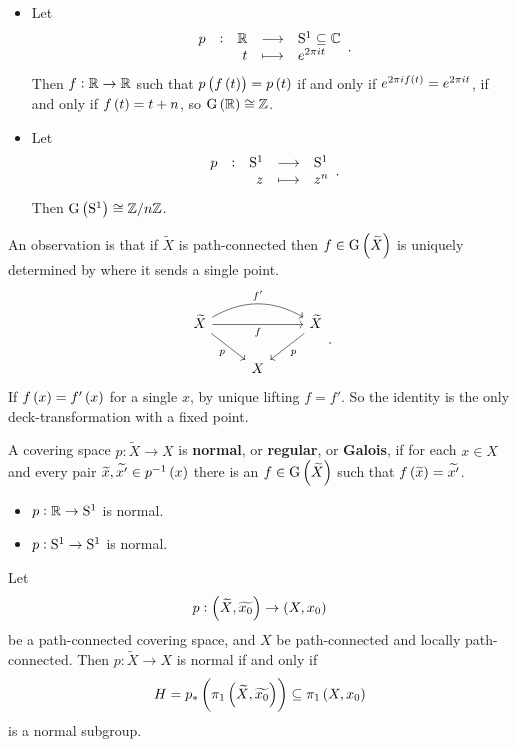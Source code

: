 \begin{example*}
\hfill
\begin{itemize}
\item Let
$$ \function[p]{\RR}{\S^1 \subseteq \CC}{t}{e^{2\pi i t}}. $$
Then $ f : \RR \to \RR $ such that $ p\br{f\br{t}} = p\br{t} $ if and only if $ e^{2\pi if\br{t}} = e^{2\pi it} $, if and only if $ f\br{t} = t + n $, so $ \G\br{\RR} \cong \ZZ $.
\item Let
$$ \function[p]{\S^1}{\S^1}{z}{z^n}. $$
Then $ \G\br{\S^1} \cong \ZZ / n\ZZ $.
\end{itemize}
\end{example*}

An observation is that if $ \widetilde{X} $ is path-connected then $ f \in \G\br{\widetilde{X}} $ is uniquely determined by where it sends a single point.
$$
\begin{tikzcd}
\widetilde{X} \arrow{rr}[swap]{f} \arrow[bend left=30]{rr}{f'} \arrow{dr}[swap]{p} & & \widetilde{X} \arrow{dl}{p} \\
& X &
\end{tikzcd}.
$$
If $ f\br{x} = f'\br{x} $ for a single $ x $, by unique lifting $ f = f' $. So the identity is the only deck-transformation with a fixed point.

\pagebreak

\begin{definition*}
A covering space $ p : \widetilde{X} \to X $ is \textbf{normal}, or \textbf{regular}, or \textbf{Galois}, if for each $ x \in X $ and every pair $ \widetilde{x}, \widetilde{x'} \in p^{-1}\br{x} $ there is an $ f \in \G\br{\widetilde{X}} $ such that $ f\br{\widetilde{x}} = \widetilde{x'} $.
\end{definition*}

\begin{example*}
\hfill
\begin{itemize}
\item $ p : \RR \to \S^1 $ is normal.
\item $ p : \S^1 \to \S^1 $ is normal.
\end{itemize}
\end{example*}

\begin{proposition}
Let
$$ p : \br{\widetilde{X}, \widetilde{x_0}} \to \br{X, x_0} $$
be a path-connected covering space, and $ X $ be path-connected and locally path-connected. Then $ p : \widetilde{X} \to X $ is normal if and only if
$$ H = p_*\br{\pi_1\br{\widetilde{X}, \widetilde{x_0}}} \subseteq \pi_1\br{X, x_0} $$
is a normal subgroup.
\end{proposition}

